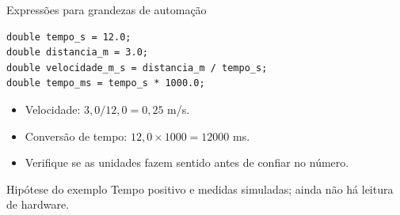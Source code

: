\begin{frame}[fragile]{Expressões para grandezas de automação}
\begin{lstlisting}
double tempo_s = 12.0;
double distancia_m = 3.0;
double velocidade_m_s = distancia_m / tempo_s;
double tempo_ms = tempo_s * 1000.0;
\end{lstlisting}
\begin{itemize}
\item Velocidade: $3{,}0 / 12{,}0 = 0{,}25$ m/s.
\item Conversão de tempo: $12{,}0 \times 1000 = 12000$ ms.
\item Verifique se as unidades fazem sentido antes de confiar no número.
\end{itemize}
\begin{block}{Hipótese do exemplo}
Tempo positivo e medidas simuladas; ainda não há leitura de hardware.
\end{block}
\end{frame}
